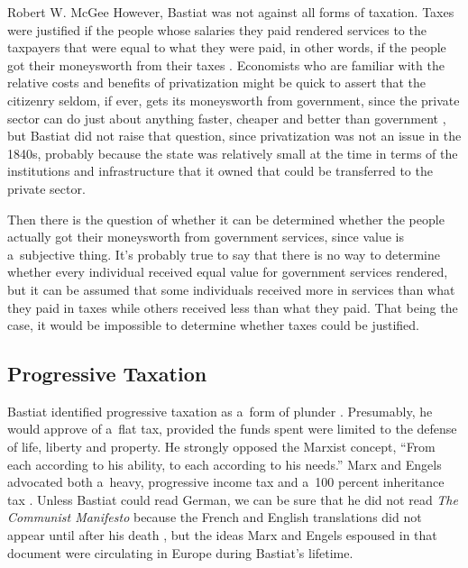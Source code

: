 \begin{artengenv}{Robert W. McGee}
However, Bastiat was not against all forms of taxation. Taxes were justified if the people whose salaries they paid rendered services to the taxpayers that were equal to what they were paid, in other words, if the people got their moneysworth from their taxes 
\parencite[][p.182]{bastiat_selected_1964}. %
 Economists who are familiar with the relative costs and benefits of privatization might be quick to assert that the citizenry seldom, if ever, gets its moneysworth from government, since the private sector can do just about anything faster, cheaper and better than government 
\parencites[][]{finley_public_1989}[][]{ohashi_privatization_nodate}[][]{pirie_privatization_1988}[][]{savas_privatizing_1991}, %
 but Bastiat did not raise that question, since privatization was not an issue in the 1840s, probably because the state was relatively small at the time in terms of the institutions and infrastructure that it owned that could be transferred to the private sector.



Then there is the question of whether it can be determined whether the people actually got their moneysworth from government services, since value is a~subjective thing. It's probably true to say that there is no way to determine whether every individual received equal value for government services rendered, but it can be assumed that some individuals received more in services than what they paid in taxes while others received less than what they paid. That being the case, it would be impossible to determine whether taxes could be justified.



\subsection{Progressive Taxation}



Bastiat identified progressive taxation as a~form of plunder 
\parencite[][pp.18]{bastiat_foreward_1998}. %
 Presumably, he would approve of a~flat tax, provided the funds spent were limited to the defense of life, liberty and property. He strongly opposed the Marxist concept, ``From each according to his ability, to each according to his needs.'' 
\parencite[][]{marx_kritik_1875} %
 Marx and Engels advocated both a~heavy, progressive income tax and a~100 percent inheritance tax 
\parencite[][]{marx_manifest_1848}. %
 Unless Bastiat could read German, we can be sure that he did not read \textit{The Communist Manifesto} 
\parencite[][]{marx_manifest_1848} %
 because the French and English translations did not appear until after his death 
\parencite[see][]{marx_communist_2010}, %
 but the ideas Marx and Engels espoused in that document were circulating in Europe during Bastiat's lifetime.




\end{artengenv}
